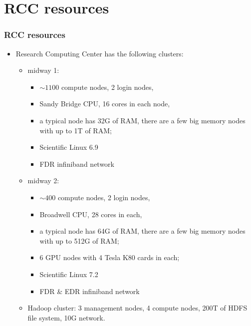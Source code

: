 \documentclass{beamer}
\begin{document}
\section{RCC resources}
\begin{frame}[fragile]
  \frametitle{RCC resources}
  \begin{itemize}
  \item {\color{mycolordef}R}esearch  {\color{mycolordef}C}omputing  {\color{mycolordef}C}enter has the following clusters:
    \begin{itemize}
    \item {\color{mycolordef}midway 1}: 
      \begin{itemize}
      \item $\sim 1100$ compute nodes, 2 login nodes, 
      \item Sandy Bridge CPU, 16 cores in each node, 
      \item a typical node has 32G of RAM, there are a few big memory nodes with up to 1T of RAM; 
      \item Scientific Linux 6.9
      \item FDR infiniband network
      \end{itemize}
    \item {\color{mycolordef}midway 2}: 
      \begin{itemize}
      \item $\sim 400$ compute nodes, 2 login nodes, 
      \item Broadwell CPU, 28 cores in each, 
      \item a typical node has 64G of RAM, there are a few big memory nodes with up to 512G of RAM; 
      \item 6 GPU nodes with 4 Tesla K80 cards in each; 
      \item Scientific Linux 7.2
      \item FDR \& EDR infiniband network
      \end{itemize}
    \item {\color{mycolordef}Hadoop cluster}: 3 management nodes, 4 compute nodes, 200T of HDFS file system, 10G network.
  \end{itemize}
\end{itemize}
\end{frame}
\end{document}
